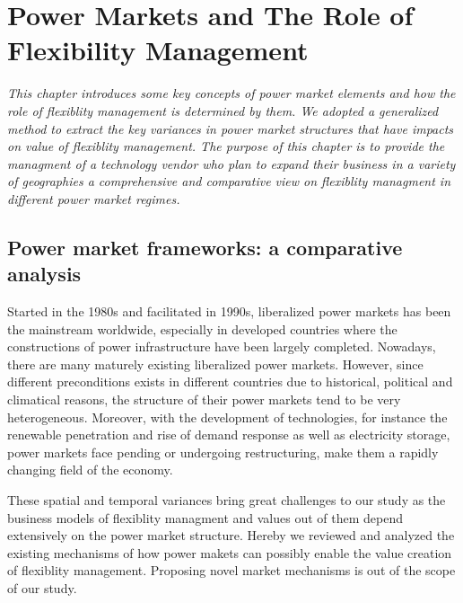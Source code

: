 \chapter{Power Markets and The Role of Flexibility Management}
\label{ch:market}
\textit{This chapter introduces some key concepts of power market elements and how the role of flexiblity management is determined by them. We adopted a generalized method to extract the key variances in power market structures that have impacts on value of flexiblity management. The purpose of this chapter is to provide the managment of a technology vendor who plan to expand their business in a variety of geographies a comprehensive and comparative view on flexiblity managment in different power market regimes.}

\section{Power market frameworks: a comparative analysis}

Started in the 1980s and facilitated in 1990s, liberalized power markets has been the mainstream worldwide, especially in developed countries where the constructions of power infrastructure have been largely completed. \cite{Srivastava2011} %
Nowadays, there are many maturely existing liberalized power markets. However, since different preconditions exists in different countries due to historical, political and climatical reasons, the structure of their power markets tend to be very heterogeneous. Moreover, with the development of technologies, for instance the renewable penetration and rise of demand response as well as electricity storage, power markets face pending or undergoing restructuring, make them a rapidly changing field of the economy. \cite{Ziel2015}

These spatial and temporal variances bring great challenges to our study as the business models of flexiblity managment and values out of them depend extensively on the power market structure. Hereby we reviewed and analyzed the existing mechanisms of how power makets can possibly enable the value creation of flexiblity management. Proposing novel market mechanisms is out of the scope of our study. 




